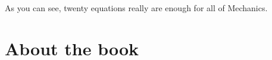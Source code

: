 \documentclass[letterpaper,9pt,journal]{IEEEtran}
\begin{document}
As you can see, twenty equations really are enough for all of Mechanics.




\vspace{-1mm}
\section*{About the book}
\end{document}
